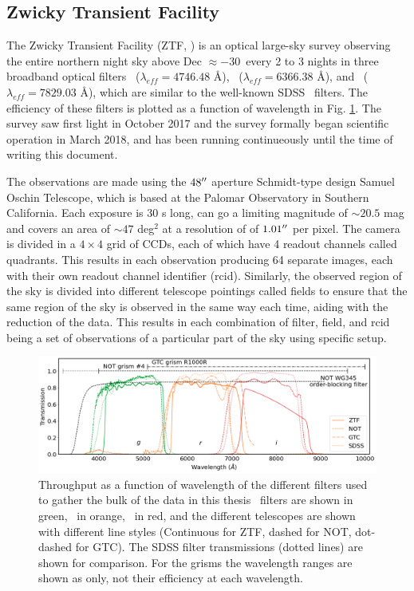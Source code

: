 \documentclass[a4paper,oneside,12pt, class=Latex/Classes/PhDthesisPSnPDF, crop=false]{standalone}
\begin{document}
\subsection{Zwicky Transient Facility}
The Zwicky Transient Facility (ZTF, \citealt{ZTF_Surveys_Scheduler, ZTF_overview_and_1st_results, ZTF_Science_Objectives, ZTF_Instrumentation, ZTF_Observing_System}) is an optical large-sky survey observing the entire northern night sky above Dec $\approx -30$\degree\ every 2 to 3 nights in three broadband optical filters \ztfg~($\lambda_{eff} = 4746.48$ \AA), \ztfr~($\lambda_{eff} = 6366.38$ \AA), and \ztfi~($\lambda_{eff} = 7829.03$ \AA), which are similar to the well-known SDSS \ztfg\ztfr\ztfi\ filters. The efficiency of these filters is plotted as a function of wavelength in Fig. \ref{Optical_elements_plot}. The survey saw first light in October 2017 and the survey formally began scientific operation in March 2018, and has been running continueously until the time of writing this document.

The observations are made using the $48^{\prime\prime}$ aperture Schmidt-type design Samuel Oschin Telescope, which is based at the Palomar Observatory in Southern California. Each exposure is 30 s long, can go a limiting magnitude of $\sim20.5$ mag and covers an area of $\sim47$ deg$^2$ at a resolution of of $1.01^{\prime\prime}$ per pixel. The camera is divided in a $4\times4$ grid of CCDs, each of which have 4 readout channels called quadrants. This results in each observation producing 64 separate images, each with their own readout channel identifier (rcid). Similarly, the observed region of the sky is divided into different telescope pointings called fields to ensure that the same region of the sky is observed in the same way each time, aiding with the reduction of the data. This results in each combination of filter, field, and rcid being a set of observations of a particular part of the sky using specific setup.

\begin{figure}
    \centering
    \includegraphics[width=\textwidth]{../Images/chapter_2/transmissions.png}
    \caption{Throughput as a function of wavelength of the different filters used to gather the bulk of the data in this thesis \ztfg\ filters are shown in green, \ztfr\ in orange, \ztfi\ in red, and the different telescopes are shown with different line styles (Continuous for ZTF, dashed for NOT, dot-dashed for GTC). The SDSS filter transmissions (dotted lines) are shown for comparison. For the grisms the wavelength ranges are shown as only, not their efficiency at each wavelength.}
    \label{Optical_elements_plot}
\end{figure}
\end{document}
